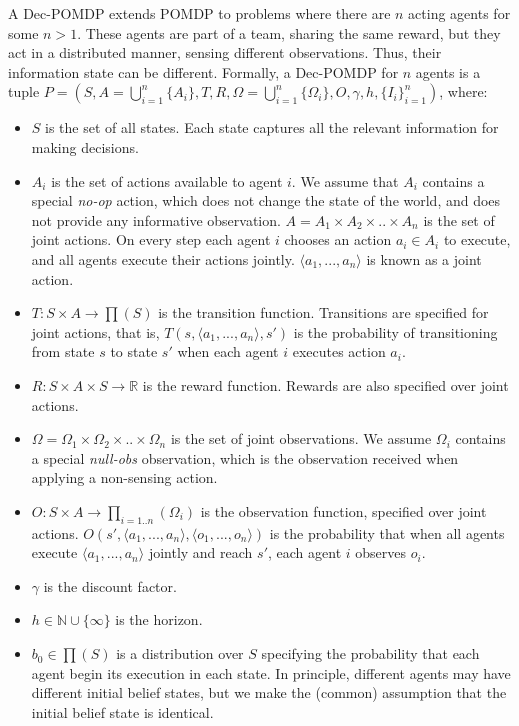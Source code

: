 \documentclass[letterpaper]{article} %
\begin{document}
A Dec-POMDP extends POMDP to problems where there are $n$ acting agents for some $n>1$. 
These agents are part of a team, sharing the same reward, but they act in a distributed manner,
sensing different observations. Thus, their information state can be different. 
Formally, a Dec-POMDP for $n$ agents is a tuple  $P=(S, A=\bigcup_{i=1}^{n}{\{A_i\}}, T, R, \Omega=\bigcup_{i=1}^{n}{\{\Omega_i\}},  O, \gamma, h, {\{I_i\}}_{i=1}^{n})$, where:
\begin{itemize}
\item
$S$ is the set of all states. Each state captures all the relevant information for making decisions. 
\item
$A_i$ is the set of actions available to agent $i$. We assume that $A_i$ contains a special {\em no-op} action, which does not change the state of the world, and does not provide any informative observation.
$A=A_1 \times A_2 \times .. \times A_n$ is the set of joint actions. On every step each agent $i$ chooses an action $a_i \in A_i$ to execute, and all agents execute their actions jointly. $\langle a_1,...,a_n \rangle$ is known as a joint action.
\item
$T:S \times A \rightarrow \prod(S)$  is the transition function. Transitions are specified for joint actions, that is, $T(s, \langle a_1,...,a_n \rangle, s')$ is the probability of transitioning from state $s$ to state $s'$ when each agent $i$ executes action $a_i$.
\item
$R:S \times A \times S \rightarrow \mathbb{R}$  is the reward function. Rewards are also specified over joint actions.
\item
$\Omega = \Omega_1 \times \Omega_2 \times .. \times \Omega_n$ is the set of joint observations. We assume $\Omega_i$ contains a special {\em null-obs} observation, which is the observation received when applying a non-sensing action.
\item
$O:S \times A \rightarrow \prod_{i=1..n}(\Omega_i)$  is the observation function, specified over joint actions. $O(s',\langle a_1,...,a_n \rangle,\langle o_1,...,o_n \rangle)$ is the probability that when all agents execute $\langle a_1,...,a_n \rangle$ jointly and reach $s'$, each agent $i$ observes $o_i$.
\item
$\gamma$  is the discount factor.
\item
$h\in\mathbb{N}\cup\{\infty\}$ is the horizon.
\item
$b_0 \in \prod(S)$ is a distribution over $S$ specifying the probability that each agent begin its execution in each state. In principle, different agents may have different initial belief states, but
we make the (common) assumption that the initial belief state is identical. 
\end{itemize}
\end{document}

